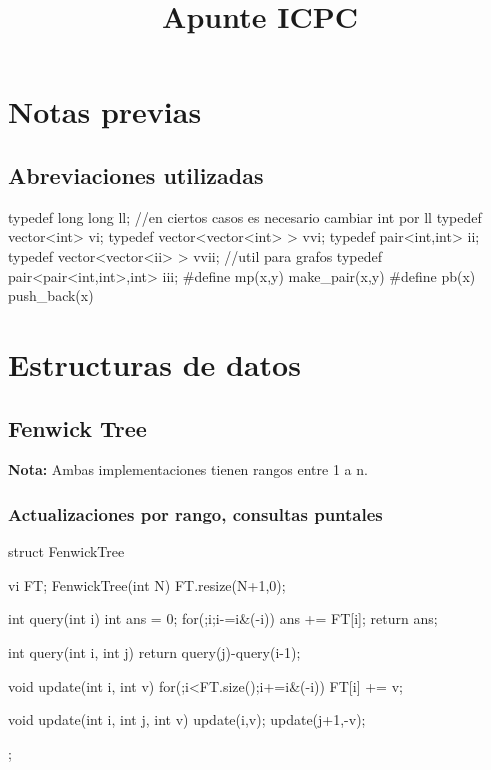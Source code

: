 \documentclass[oneside]{book}
\title{Apunte ICPC}
\begin{document}
  {
    \lstset{
        language=C++,
        numbers=left,
        stepnumber=1,
        basicstyle=\footnotesize\ttfamily}
  }
  {
  }


	\maketitle	
	\tableofcontents

	\frontmatter
	\chapter{Notas previas}
	\section{Abreviaciones utilizadas}
\begin{codigo}
typedef long long ll;
//en ciertos casos es necesario cambiar int por ll
typedef vector<int> vi;
typedef vector<vector<int> > vvi;
typedef pair<int,int> ii;
typedef vector<vector<ii> > vvii;		//util para grafos
typedef pair<pair<int,int>,int> iii;
#define mp(x,y) make_pair(x,y)
#define pb(x) push_back(x)
\end{codigo}

	\mainmatter
	\chapter{Estructuras de datos}
	\section{Fenwick Tree}
	\textbf{Nota:} Ambas implementaciones tienen rangos entre 1 a n. 
	\subsection{Actualizaciones por rango, consultas puntales }
	\begin{codigo}
struct FenwickTree{
  vi FT;
  FenwickTree(int N){
     FT.resize(N+1,0);
  }

  int query(int i){
     int ans = 0;
     for(;i;i-=i&(-i)) ans += FT[i];
     return ans;
  }

  int query(int i, int j){
     return query(j)-query(i-1);
  }

  void update(int i, int v){
     for(;i<FT.size();i+=i&(-i)) FT[i] += v;
  }

  void update(int i, int j, int v){
     update(i,v); update(j+1,-v);
  }
};

	\end{codigo}
	\pagebreak
\end{document}
